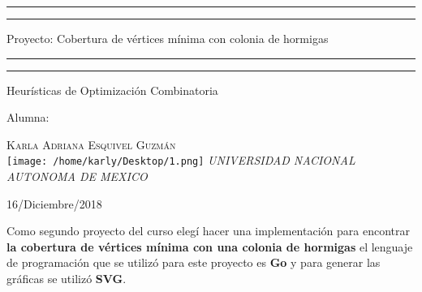 \documentclass[a4paper, 11pt, spanish, oneside]{book}
\begin{document}
 

\begin{titlepage} 

	\centering 
	
	\scshape 
	
	\vspace*{\baselineskip} 
	
	
	
	\rule{\textwidth}{1.6pt}\vspace*{-\baselineskip}\vspace*{2pt} 
	\rule{\textwidth}{0.4pt} 
	
	\vspace{0.75\baselineskip} 
	
	{\LARGE Proyecto: Cobertura de vértices mínima con colonia de hormigas}	
	\vspace{0.75\baselineskip} 
	
	\rule{\textwidth}{0.4pt}\vspace*{-\baselineskip}\vspace{3.2pt}
	\rule{\textwidth}{1.6pt} 
	
	\vspace{2\baselineskip} 
	

	Heurísticas de Optimización Combinatoria
	
	\vspace*{3\baselineskip} 
	
	
	Alumna:
	
	\vspace{0.5\baselineskip} 
	
	{\scshape\Large Karla Adriana Esquivel Guzmán \\} 
	\vspace{0.5\baselineskip} 
	\texttt{[image: /home/karly/Desktop/1.png]}
	\vfill
	\textit{UNIVERSIDAD NACIONAL AUTONOMA DE MEXICO} 
	
	
	
	
	
	
	\vspace{0.3\baselineskip} 
	
	16/Diciembre/2018 
	
	 

\end{titlepage}
\newpage
Como segundo proyecto del curso elegí hacer una implementación para encontrar \textbf{la cobertura de vértices mínima con una colonia de hormigas} el lenguaje de programación que se utilizó para este proyecto es \textbf{Go} y para generar las gráficas se utilizó \textbf{SVG}.
\end{document}
